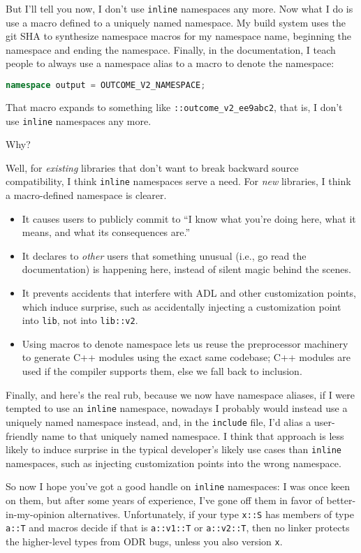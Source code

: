 But I'll tell you now, I don't use \texttt{inline} namespaces any more.
Now what I do is use a macro defined to a uniquely named namespace. My
build system uses the git SHA to synthesize namespace macros for my
namespace name, beginning the namespace and ending the namespace.
Finally, in the documentation, I teach people to always use a namespace
alias to a macro to denote the namespace:

\begin{lstlisting}[language=C++]
namespace output = OUTCOME_V2_NAMESPACE;
\end{lstlisting} 

\noindent That macro expands to something like \texttt{::outcome\_v2\_ee9abc2},
that is, I don't use \texttt{inline} namespaces any more.

Why?

Well, for \emph{existing} libraries that don't want to break backward
source compatibility, I think \texttt{inline} namespaces serve a need.
For \emph{new} libraries, I think a macro-defined namespace is clearer.
\begin{itemize}
\item{It causes users to publicly commit to ``I know what you’re doing here, what it means, and what its consequences are.''}
\item{It declares to \emph{other} users that something unusual (i.e., go read the documentation) is happening here, instead of silent magic behind the scenes.}
\item{It prevents accidents that interfere with ADL and other customization points, which induce surprise, such as accidentally injecting a customization point into \texttt{lib}, not into \texttt{lib::v2}.}
\item{Using macros to denote namespace lets us reuse the preprocessor machinery to generate C++ modules using the exact same codebase; C++ modules are used if the compiler supports them, else we fall back to inclusion.}
\end{itemize}

Finally, and here's the real rub, because we now have namespace aliases,
if I were tempted to use an \texttt{inline} namespace, nowadays I probably would
instead use a uniquely named namespace instead, and, in the \texttt{include} file,
I'd alias a user-friendly name to that uniquely named namespace. I think
that approach is less likely to induce surprise in the typical
developer's likely use cases than \texttt{inline} namespaces, such as
injecting customization points into the wrong namespace.

So now I hope you've got a good handle on \texttt{inline} namespaces: I
was once keen on them, but after some years of experience, I've gone off
them in favor of better-in-my-opinion alternatives. Unfortunately, if your type \texttt{x::S} has members of type
\texttt{a::T} and macros decide if that is \texttt{a::v1::T} or
\texttt{a::v2::T}, then no linker protects the higher-level types from
ODR bugs, unless you also version \texttt{x}.


